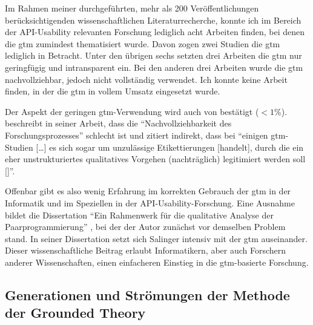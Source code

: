 Im Rahmen meiner durchgeführten, mehr als 200 Veröffentlichungen berücksichtigenden wissenschaftlichen Literaturrecherche, konnte ich im Bereich der API-Usability relevanten Forschung lediglich acht Arbeiten finden, bei denen die \gls{gtm} zumindest thematisiert wurde. Davon zogen zwei Studien \citep{Cao:2010ku,Ko:2011vw} die \gls{gtm} lediglich in Betracht. Unter den übrigen sechs setzten drei Arbeiten \citep{Tenny:2011jp,deSouza:2004fd,sunshine2014searching} die \gls{gtm} nur geringfügig und intransparent ein. Bei den anderen drei Arbeiten \citep{Simula.simula.1294,Yamashita:2013hn,Yamashita:2013un} wurde die \gls{gtm} nachvollziehbar, jedoch nicht vollständig verwendet. Ich konnte keine Arbeit finden, in der die \gls{gtm} in vollem Umsatz eingesetzt wurde.

Der Aspekt der geringen \gls{gtm}-Verwendung wird auch von \cite{Glass:2002ec} bestätigt ($<1\%$). \cite{Salinger:2013vd} beschreibt in seiner Arbeit, dass die ``Nachvollziehbarkeit des Forschungsprozesses'' schlecht ist und zitiert indirekt, dass bei ``einigen \gls{gtm}-Studien [\ldots] es sich sogar um unzulässige Etikettierungen [handelt], durch die ein eher unstrukturiertes qualitatives Vorgehen (nachträglich) legitimiert werden soll [\citep[][S. 147 bzw. S. 633]{oates2006researching,Suddaby:2006ja}]''.

Offenbar gibt es also wenig Erfahrung im korrekten Gebrauch der \gls{gtm} in der Informatik und im Speziellen in der API-Usability-Forschung. Eine Ausnahme bildet die Dissertation ``Ein Rahmenwerk für die qualitative Analyse der Paarprogrammierung'' \citep{Salinger:2013vd}, bei der der Autor zunächst vor demselben Problem stand. In seiner Dissertation setzt sich Salinger intensiv mit der \gls{gtm} auseinander. Dieser wissenschaftliche Beitrag erlaubt Informatikern, aber auch Forschern anderer Wissenschaften, einen einfacheren Einstieg in die \gls{gtm}-basierte Forschung.



\subsection{Generationen und Strömungen der Methode der Grounded Theory}

